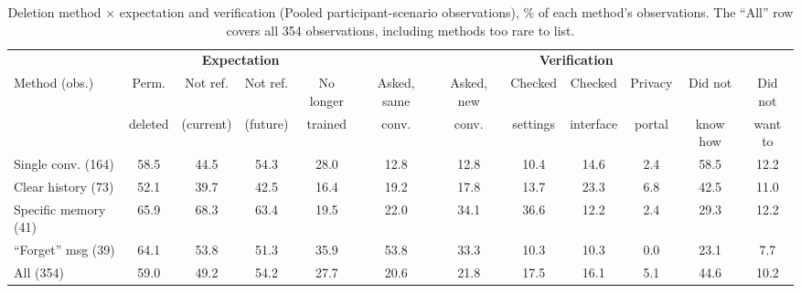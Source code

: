 \documentclass[conference,compsoc]{IEEEtran}
\begin{document}
\begin{table}[t]
\centering
\caption{Deletion method $\times$ expectation and verification (Pooled participant-scenario observations), \% of each method's observations. The ``All'' row covers all 354 observations, including methods too rare to list.}
\label{tab:contingency}
\small
\setlength{\tabcolsep}{3.5pt}
\begin{tabular}{lccccccccccc}
\toprule
 & \multicolumn{4}{c}{\textbf{Expectation}} & \multicolumn{7}{c}{\textbf{Verification}} \\
\cmidrule(lr){2-5}\cmidrule(lr){6-12}
Method (obs.) & Perm. & Not ref. & Not ref. & No longer
  & Asked, same & Asked, new & Checked & Checked & Privacy & Did not & Did not \\
 & deleted & (current) & (future) & trained
  & conv. & conv. & settings & interface & portal & know how & want to \\
\midrule
Single conv. (164)  & 58.5 & 44.5 & 54.3 & 28.0 & 12.8 & 12.8 & 10.4 & 14.6 & 2.4 & 58.5 & 12.2 \\
Clear history (73)  & 52.1 & 39.7 & 42.5 & 16.4 & 19.2 & 17.8 & 13.7 & 23.3 & 6.8 & 42.5 & 11.0 \\
Specific memory (41) & 65.9 & 68.3 & 63.4 & 19.5 & 22.0 & 34.1 & 36.6 & 12.2 & 2.4 & 29.3 & 12.2 \\
``Forget'' msg (39) & 64.1 & 53.8 & 51.3 & 35.9 & 53.8 & 33.3 & 10.3 & 10.3 & 0.0 & 23.1 & 7.7 \\
\midrule
All (354) & 59.0 & 49.2 & 54.2 & 27.7 & 20.6 & 21.8 & 17.5 & 16.1 & 5.1 & 44.6 & 10.2 \\
\bottomrule
\end{tabular}
\label{tab:verification}
\end{table}
\end{document}
